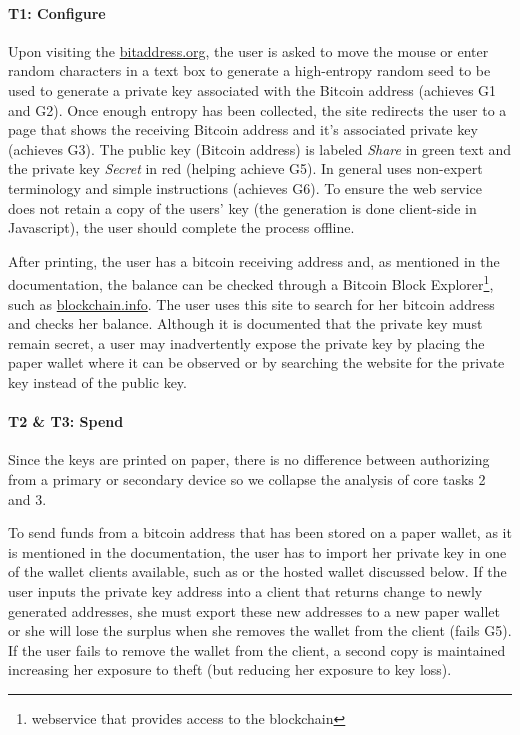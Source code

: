 \paragraph{T1: Configure} Upon visiting the \url{bitaddress.org}, the user is asked to move the mouse or enter random characters in a text box to generate a high-entropy random seed to be used to generate a private key associated with the Bitcoin address (achieves G1 and G2). Once enough entropy has been collected, the site redirects the user to a page that shows the receiving Bitcoin address and it's associated private key (achieves G3). The public key (Bitcoin address) is labeled \emph{Share} in green text and the private key \emph{Secret} in red (helping achieve G5). In general \paper uses non-expert terminology and simple instructions (achieves G6). To ensure the web service does not retain a copy of the users' key (the generation is done client-side in Javascript), the user should complete the process offline.

After printing, the user has a bitcoin receiving address and, as mentioned in the documentation, the balance can be checked through a Bitcoin Block Explorer\footnote{webservice that provides access to the blockchain}, such as \url{blockchain.info}. The user uses this site to search for her bitcoin address and checks her balance. Although it is documented that the private key must remain secret, a user may inadvertently expose the private key by placing the paper wallet where it can be observed or by searching the website for the private key instead of the public key. %

\paragraph{T2 \& T3: Spend} Since the keys are printed on paper, there is no difference between authorizing from a primary or secondary device so we collapse the analysis of core tasks 2 and 3.
 
To send funds from a bitcoin address that has been stored on a paper wallet, as it is mentioned in the documentation, the user has to import her private key in one of the wallet clients available, such as \armory or the \block hosted wallet discussed below. If the user inputs the private key address into a client that returns change to newly generated addresses, she must export these new addresses to a new paper wallet or she will lose the surplus when she removes the wallet from the client (fails G5). If the user fails to remove the wallet from the client, a second copy is maintained increasing her exposure to theft (but reducing her exposure to key loss). 

